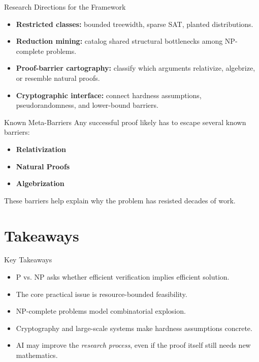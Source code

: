 \documentclass[aspectratio=43]{beamer}
\begin{document}
\begin{frame}{Research Directions for the Framework}
\begin{itemize}
    \item \textbf{Restricted classes:} bounded treewidth, sparse SAT, planted distributions.
    \item \textbf{Reduction mining:} catalog shared structural bottlenecks among NP-complete problems.
    \item \textbf{Proof-barrier cartography:} classify which arguments relativize, algebrize, or resemble natural proofs.
    \item \textbf{Cryptographic interface:} connect hardness assumptions, pseudorandomness, and lower-bound barriers.
\end{itemize}
\end{frame}

\begin{frame}{Known Meta-Barriers}
Any successful proof likely has to escape several known barriers:
\begin{itemize}
    \item \textbf{Relativization}
    \item \textbf{Natural Proofs}
    \item \textbf{Algebrization}
\end{itemize}

\medskip
These barriers help explain why the problem has resisted decades of work.
\end{frame}

\section{Takeaways}

\begin{frame}{Key Takeaways}
\begin{itemize}
    \item P vs\@. NP asks whether efficient verification implies efficient solution.
    \item The core practical issue is resource-bounded feasibility.
    \item NP-complete problems model combinatorial explosion.
    \item Cryptography and large-scale systems make hardness assumptions concrete.
    \item AI may improve the \emph{research process}, even if the proof itself still needs new mathematics.
\end{itemize}
\end{frame}
\end{document}
